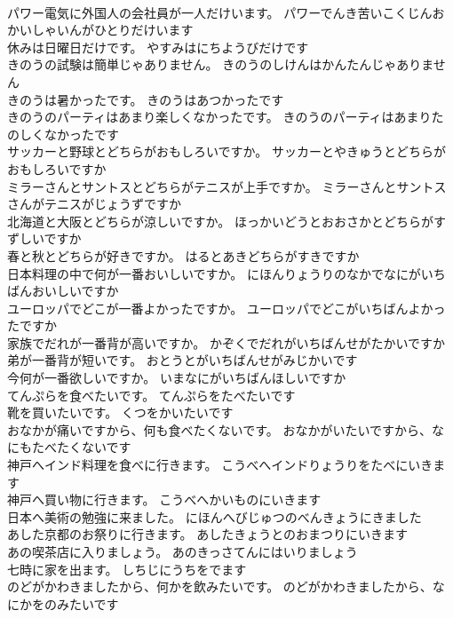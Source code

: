 \documentclass[8pt]{extreport}
\begin{document}
\begin{CJK}{UTF8}{min}
\\	パワー電気に外国人の会社員が一人だけいます。	パワーでんき苦いこくじんおかいしゃいんがひとりだけいます 
\\	休みは日曜日だけです。	やすみはにちようびだけです 
\\	きのうの試験は簡単じゃありません。	きのうのしけんはかんたんじゃありません 
\\	きのうは暑かったです。	きのうはあつかったです 
\\	きのうのパーティはあまり楽しくなかったです。	きのうのパーティはあまりたのしくなかったです 
\\	サッカーと野球とどちらがおもしろいですか。	サッカーとやきゅうとどちらがおもしろいですか 
\\	ミラーさんとサントスとどちらがテニスが上手ですか。	ミラーさんとサントスさんがテニスがじょうずですか 
\\	北海道と大阪とどちらが涼しいですか。	ほっかいどうとおおさかとどちらがすずしいですか 
\\	春と秋とどちらが好きですか。	はるとあきどちらがすきですか 
\\	日本料理の中で何が一番おいしいですか。	にほんりょうりのなかでなにがいちばんおいしいですか 
\\	ユーロッパでどこが一番よかったですか。	ユーロッパでどこがいちばんよかったですか 
\\	家族でだれが一番背が高いですか。	かぞくでだれがいちばんせがたかいですか 
\\	弟が一番背が短いです。	おとうとがいちばんせがみじかいです 
\\	今何が一番欲しいですか。	いまなにがいちばんほしいですか 
\\	てんぷらを食べたいです。	てんぷらをたべたいです 
\\	靴を買いたいです。	くつをかいたいです 
\\	おなかが痛いですから、何も食べたくないです。	おなかがいたいですから、なにもたべたくないです 
\\	神戸へインド料理を食べに行きます。	こうべへインドりょうりをたべにいきます 
\\	神戸へ買い物に行きます。	こうべへかいものにいきます 
\\	日本へ美術の勉強に来ました。	にほんへびじゅつのべんきょうにきました 
\\	あした京都のお祭りに行きます。	あしたきょうとのおまつりにいきます 
\\	あの喫茶店に入りましょう。	あのきっさてんにはいりましょう 
\\	七時に家を出ます。	しちじにうちをでます 
\\	のどがかわきましたから、何かを飲みたいです。	のどがかわきましたから、なにかをのみたいです 

\end{CJK}
\end{document}
